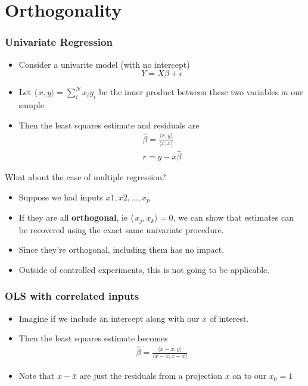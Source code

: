 \section{Orthogonality}

\begin{frame}
    \frametitle{Univariate Regression}
    \begin{itemize}
    \item Consider a univarite model (with no intercept)
    $$ Y= X\beta + \epsilon $$
    \item Let $\langle\, x, y \rangle = \sum_i^N x_i y_i$ be the inner product between these two variables in our sample.
    \item Then the least squares estimate and residuals are 
    \begin{eqnarray*}
        \hat \beta = \frac{\langle x , y \rangle}{\langle x, x \rangle} \\
        r = y - x \hat \beta
    \end{eqnarray*}
    \end{itemize}
\end{frame}

\begin{frame}{What about the case of multiple regression?}
    \begin{itemize}
        \item Suppose we had inputs $x1,x2,...,x_p$
        \item If they are all \textbf{orthogonal}, ie $\langle\, x_j, x_k \rangle =0$, we can show that estimates can be recovered using the exact same univariate procedure. 
        \item Since they're orthogonal, including them has no impact. 
        \item Outside of controlled experiments, this is not going to be applicable. 
\end{itemize}
\end{frame}

\begin{frame}
    \frametitle{OLS with correlated inputs}
    \begin{itemize}
    \item Imagine if we include an intercept along with our $x$ of interest.
    \item Then the least squares estimate becomes 
    \begin{eqnarray*}
        \hat \beta = \frac{\langle x - \bar x , y \rangle}{\langle x - \bar x , x - \bar x \rangle}
    \end{eqnarray*}
    \item Note that $x - \bar x $ are just the residuals from a projection $x$ on to our $x_0= 1$
    \end{itemize}
\end{frame}

